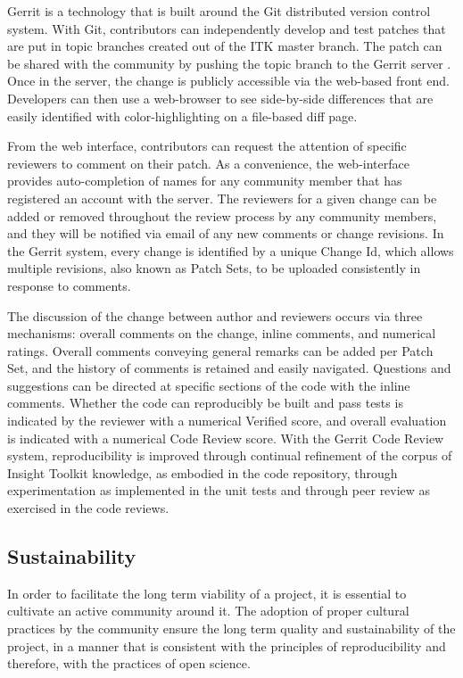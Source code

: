 \documentclass{frontiersENG} %
\begin{document}
Gerrit is a technology that is built around the Git distributed version control
system.  With Git, contributors can independently develop and test patches that
are put in topic branches created out of the ITK master branch.  The
patch can be shared with the community by pushing the topic branch to the
Gerrit server \cite{ITKGerrit}.  Once in the server, the change is publicly
accessible via the web-based front end.  Developers can then use a web-browser
to see side-by-side differences that are easily identified with
color-highlighting on a file-based diff page.

From the web interface, contributors can request the attention of specific
reviewers to comment on their patch. As a convenience, the web-interface
provides auto-completion of names for any community member that has registered
an account with the server.  The reviewers for a given change can be added or
removed throughout the review process by any community members, and they will
be notified via email of any new comments or change revisions.  In the Gerrit
system, every change is identified by a unique Change Id, which allows multiple
revisions, also known as Patch Sets, to be uploaded consistently in response to
comments.

The discussion of the change between author and reviewers occurs via three
mechanisms: overall comments on the change, inline comments, and numerical
ratings. Overall comments conveying general remarks can be added per Patch
Set, and the history of comments is retained and easily navigated. Questions
and suggestions can be directed at specific sections of the code with the
inline comments. Whether the code can reproducibly be built and pass tests is
indicated by the reviewer with a numerical Verified score, and overall
evaluation is indicated with a numerical Code Review score. With the Gerrit
Code Review system, reproducibility is improved through continual refinement of
the corpus of Insight Toolkit knowledge, as embodied in the code repository,
through experimentation as implemented in the unit tests and through peer
review as exercised in the code reviews.



\subsection{Sustainability}

In order to facilitate the long term viability of a project, it is essential to
cultivate an active community around it. The adoption of proper cultural
practices by the community ensure the long term quality and sustainability of
the project, in a manner that is consistent with the principles of
reproducibility and therefore, with the practices of open science.
\end{document}
